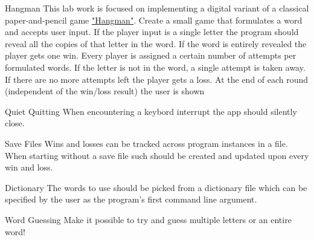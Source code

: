 \begin{lab}{Hangman}
    This lab work is focused on implementing a digital variant of a classical 
    paper-and-pencil game \href{https://en.wikipedia.org/wiki/Hangman_(game)}{"Hangman"}.
    Create a small game that formulates a word and accepts user input.
    If the player input is a single letter the program should reveal all the copies of
    that letter in the word. If the word is entirely revealed the player gets one win.
    Every player is assigned a certain number of attempts per formulated words.
    If the letter is not in the word, a single attempt is taken away. If there are 
    no more attempts left the player gets a loss. At the end of each round
    (independent of the win/loss result) the user is shown

    \begin{labext}{Quiet Quitting}
        When encountering a keybord interrupt the app should silently close.
    \end{labext}
    \begin{labext}{Save Files}
        Wins and losses can be tracked across program instances in a file. 
        When starting without a save file such should be created and updated
        upon every win and loss.
    \end{labext}
    \begin{labext}{Dictionary}
        The words to use should be picked from a dictionary file which can be
        specified by the user as the program's first command line argument.
    \end{labext}
    \begin{labext}{Word Guessing}
        Make it possible to try and guess multiple letters or an entire word!
    \end{labext}
\end{lab}
